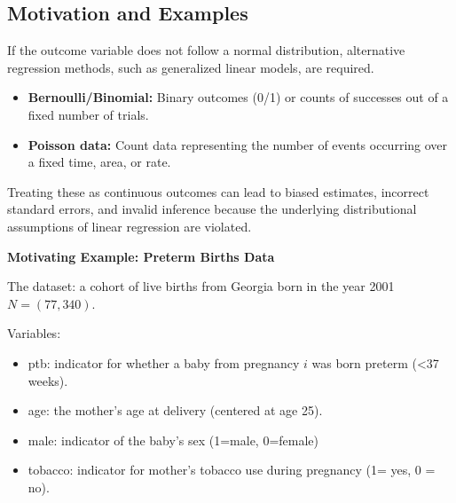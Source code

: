 \documentclass[
  letterpaper,
  DIV=11,
  numbers=noendperiod]{scrreprt}
\providecommand{\tightlist}{%
  \setlength{\itemsep}{0pt}\setlength{\parskip}{0pt}}\usepackage{longtable,booktabs,array}
\begin{document}
\hypertarget{motivation-and-examples-2}{%
\subsection*{Motivation and Examples}\label{motivation-and-examples-2}}

\begin{tcolorbox}[enhanced jigsaw, breakable, colbacktitle=quarto-callout-important-color!10!white, left=2mm, colframe=quarto-callout-important-color-frame, opacityback=0, coltitle=black, colback=white, rightrule=.15mm, title=\textcolor{quarto-callout-important-color}{\faExclamation}\hspace{0.5em}{Motivation:}, titlerule=0mm, opacitybacktitle=0.6, leftrule=.75mm, toprule=.15mm, arc=.35mm, bottomtitle=1mm, toptitle=1mm, bottomrule=.15mm]

If the outcome variable does not follow a normal distribution,
alternative regression methods, such as generalized linear models, are
required.

\begin{itemize}
\tightlist
\item
  \textbf{Bernoulli/Binomial:} Binary outcomes (0/1) or counts of
  successes out of a fixed number of trials.
\item
  \textbf{Poisson data:} Count data representing the number of events
  occurring over a fixed time, area, or rate.
\end{itemize}

Treating these as continuous outcomes can lead to biased estimates,
incorrect standard errors, and invalid inference because the underlying
distributional assumptions of linear regression are violated.

\end{tcolorbox}

\textbf{Motivating Example: Preterm Births Data}

The dataset: a cohort of live births from Georgia born in the year 2001
\(N = (77,340)\).

Variables:

\begin{itemize}
\item
  ptb: indicator for whether a baby from pregnancy \(i\) was born
  preterm (\textless37 weeks).
\item
  age: the mother's age at delivery (centered at age 25).
\item
  male: indicator of the baby's sex (1=male, 0=female)
\item
  tobacco: indicator for mother's tobacco use during pregnancy (1= yes,
  0 = no).
\end{itemize}
\end{document}
